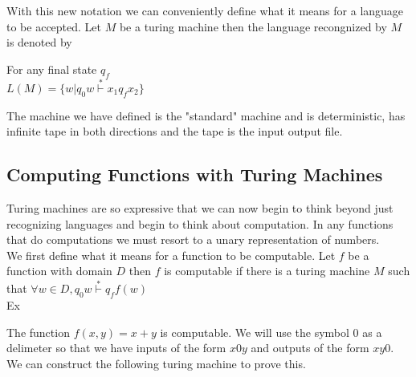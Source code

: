 \documentclass[11pt]{exam}
\begin{document}
With this new notation we can conveniently define what it means for a language to be accepted.
Let $M$ be a turing machine then the language recongnized by $M$ is denoted by 
\begin{center}
For any final state $q_f$\\
$L(M) = \{w | q_0w \stackrel{*}{\vdash} x_1q_fx_2\}$
\end{center}

The machine we have defined is the "standard" machine and is deterministic, has infinite tape in both directions 
and the tape is the input output file.

\subsection{Computing Functions with Turing Machines}

Turing machines are so expressive that we can now begin to think beyond just recognizing languages
and begin to think about computation. In any functions that do computations we must resort to a unary 
representation of numbers.\\

We first define what it means for a function to be computable. Let $f$ be a function with domain $D$ then 
$f$ is computable if there is a turing machine $M$ such that $\forall w \in D, q_0w \stackrel{*}{\vdash} q_ff(w)$\\

Ex
\begin{center}
The function  $f(x,y) = x + y$ is computable. We will use the symbol 0 as
a delimeter so that we have inputs of the form $x0y$ and outputs of the form
$xy0$. We can construct the following turing machine to prove this. \\
\\
\end{center}
\end{document}
